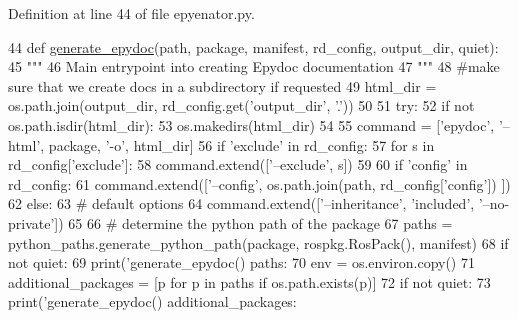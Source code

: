 Definition at line 44 of file epyenator.\+py.


\begin{DoxyCode}
44 \textcolor{keyword}{def }\hyperlink{namespacerosdoc__lite_1_1epyenator_ade3100701733d5e37b07cc1964566ebc}{generate\_epydoc}(path, package, manifest, rd\_config, output\_dir, quiet):
45     \textcolor{stringliteral}{"""}
46 \textcolor{stringliteral}{    Main entrypoint into creating Epydoc documentation}
47 \textcolor{stringliteral}{    """}
48     \textcolor{comment}{#make sure that we create docs in a subdirectory if requested}
49     html\_dir = os.path.join(output\_dir, rd\_config.get(\textcolor{stringliteral}{'output\_dir'}, \textcolor{stringliteral}{'.'}))
50 
51     \textcolor{keywordflow}{try}:
52         \textcolor{keywordflow}{if} \textcolor{keywordflow}{not} os.path.isdir(html\_dir):
53             os.makedirs(html\_dir)
54 
55         command = [\textcolor{stringliteral}{'epydoc'}, \textcolor{stringliteral}{'--html'}, package, \textcolor{stringliteral}{'-o'}, html\_dir]
56         \textcolor{keywordflow}{if} \textcolor{stringliteral}{'exclude'} \textcolor{keywordflow}{in} rd\_config:
57             \textcolor{keywordflow}{for} s \textcolor{keywordflow}{in} rd\_config[\textcolor{stringliteral}{'exclude'}]:
58                 command.extend([\textcolor{stringliteral}{'--exclude'}, s])
59 
60         \textcolor{keywordflow}{if} \textcolor{stringliteral}{'config'} \textcolor{keywordflow}{in} rd\_config:
61             command.extend([\textcolor{stringliteral}{'--config'}, os.path.join(path, rd\_config[\textcolor{stringliteral}{'config'}]) ])
62         \textcolor{keywordflow}{else}:
63             \textcolor{comment}{# default options}
64             command.extend([\textcolor{stringliteral}{'--inheritance'}, \textcolor{stringliteral}{'included'}, \textcolor{stringliteral}{'--no-private'}])
65 
66         \textcolor{comment}{# determine the python path of the package}
67         paths = python\_paths.generate\_python\_path(package, rospkg.RosPack(), manifest)
68         \textcolor{keywordflow}{if} \textcolor{keywordflow}{not} quiet:
69             print(\textcolor{stringliteral}{'generate\_epydoc() paths: %
70         env = os.environ.copy()
71         additional\_packages = [p \textcolor{keywordflow}{for} p \textcolor{keywordflow}{in} paths \textcolor{keywordflow}{if} os.path.exists(p)]
72         \textcolor{keywordflow}{if} \textcolor{keywordflow}{not} quiet:
73             print(\textcolor{stringliteral}{'generate\_epydoc() additional\_packages: %
}}
\end{DoxyCode}
